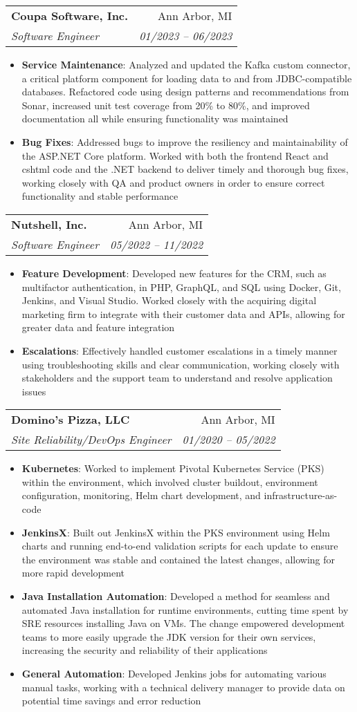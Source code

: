 \documentclass[letterpaper,10pt]{article}
\makeatletter
\newcommand{\resumeItem}[2]{
  \item\small{
    \textbf{#1}{: #2 \vspace{-2pt}}
  }
}
\newcommand{\resumeSubheading}[4]{
  \vspace{-1pt}\item
    \begin{tabular*}{0.97\textwidth}[t]{l@{\extracolsep{\fill}}r}
      \textbf{#1} & #2 \\
      \textit{\small#3} & \textit{\small #4} \\
    \end{tabular*}\vspace{-5pt}
}
\newcommand{\resumeItemListStart}{\begin{itemize}}
\newcommand{\resumeItemListEnd}{\end{itemize}\vspace{-5pt}}
\makeatother
\begin{document}
    \resumeSubheading
      {Coupa Software, Inc.}{Ann Arbor, MI}
      {Software Engineer}{01/2023 -- 06/2023}
      \resumeItemListStart
        \resumeItem{Service Maintenance}
          {Analyzed and updated the Kafka custom connector, a critical platform component for loading data to and from JDBC-compatible databases. Refactored code using design patterns and recommendations from Sonar, increased unit test coverage from 20\% to 80\%, and improved documentation all while ensuring functionality was maintained}
        \resumeItem{Bug Fixes}
          {Addressed bugs to improve the resiliency and maintainability of the ASP.NET Core platform. Worked with both the frontend React and cshtml code and the .NET backend to deliver timely and thorough bug fixes, working closely with QA and product owners in order to ensure correct functionality and stable performance}
      \resumeItemListEnd
    
    \resumeSubheading
      {Nutshell, Inc.}{Ann Arbor, MI}
      {Software Engineer}{05/2022 -- 11/2022}
      \resumeItemListStart
        \resumeItem{Feature Development}
          {Developed new features for the CRM, such as multifactor authentication, in PHP, GraphQL, and SQL using Docker, Git, Jenkins, and Visual Studio. Worked closely with the acquiring digital marketing firm to integrate with their customer data and APIs, allowing for greater data and feature integration}
        \resumeItem{Escalations}
          {Effectively handled customer escalations in a timely manner using troubleshooting skills and clear communication, working closely with stakeholders and the support team to understand and resolve application issues}
      \resumeItemListEnd

    \resumeSubheading
      {Domino's Pizza, LLC}{Ann Arbor, MI}
      {Site Reliability/DevOps Engineer}{01/2020 -- 05/2022}
      \resumeItemListStart
        \resumeItem{Kubernetes}
          {Worked to implement Pivotal Kubernetes Service (PKS) within the environment, which involved cluster buildout, environment configuration, monitoring, Helm chart development, and infrastructure-as-code}
        \resumeItem{JenkinsX}
          {Built out JenkinsX within the PKS environment using Helm charts and running end-to-end validation scripts for each update to ensure the environment was stable and contained the latest changes, allowing for more rapid development}
        \resumeItem{Java Installation Automation}
          {Developed a method for seamless and automated Java installation for runtime environments, cutting time spent by SRE resources installing Java on VMs. The change empowered development teams to more easily upgrade the JDK version for their own services, increasing the security and reliability of their applications}
        \resumeItem{General Automation}
          {Developed Jenkins jobs for automating various manual tasks, working with a technical delivery manager to provide data on potential time savings and error reduction}
      \resumeItemListEnd
\end{document}
